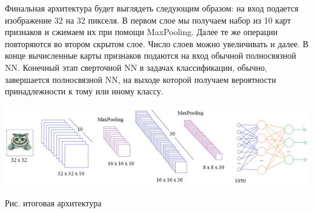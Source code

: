 \documentclass{article}
\begin{document}
	Финальная архитектура будет выглядеть следующим образом: на вход подается изображение 32 на 32 пикселя. В первом слое мы получаем набор из 10 карт признаков и сжимаем их при помощи MaxPooling. Далее те же операции повторяются во втором скрытом слое. Число слоев можно увеличивать и далее. В конце вычисленные карты признаков подаются на вход обычной полносвязной NN. Конечный этап сверточной NN в задачах классификации, обычно, завершается полносвязной NN, на выходе которой получаем вероятности принадлежности к тому или иному классу.

	\noindent \includegraphics[width=\textwidth]{pic12.jpg}
	\begin{center}
	Рис. итоговая архитектура
	\end{center}
\end{document}
